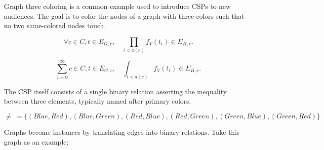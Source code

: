 \begin{comment}

\begin{betterpython}
    def even_constraint(last_state, next_state_var, solver):
        n = solver.IntVar(0, solver.infinity(), 'n_even')
        b = solver.BoolVar('b_even')
        solver.Add(next_state_var - 2 * n <= M * (1 - b))
        solver.Add(next_state_var - 2 * n >= -M * (1 - b))
        return [(b, 1)]
\end{betterpython}

\begin{lstlisting}{python}
    def odd_constraint(last_state, next_state_var, solver):
        n = solver.IntVar(0, solver.infinity(), 'n_odd')
        b = solver.BoolVar('b_odd')
        solver.Add(next_state_var - 2 * n - 1 <= M * (1 - b))
        solver.Add(next_state_var - 2 * n - 1 >= -M * (1 - b))
        return [(b, 1)]
\end{lstlisting}

\end{comment}
Graph three coloring is a common example used to introduce CSPs to new audiences. The goal is to color the nodes of a graph with three colors such that no two same-colored nodes touch. 

\begin{equation}
    \forall c \in C, t \in E_{G, c}, \quad \prod_{i<a(c)} f_V(t_i) \in E_{H, c}.    
\end{equation}


\begin{equation}
    \sum_{i=0}^\infty c \in C, t \in E_{G, c}, \quad \int_{i<a(c)} f_V(t_i) \in E_{H, c}.    
\end{equation}

The CSP itself consists of a single binary relation asserting the inequality between three elements, typically named after primary colors.

\begin{equation}\label{equation:three-color-neq-def}
  \scriptscriptstyle \neq\ = \{ (\mathit{Blue}, \mathit{Red}), (\mathit{Blue}, \mathit{Green}), (\mathit{Red}, \mathit{Blue}), (\mathit{Red}, \mathit{Green}), (\mathit{Green}, \mathit{Blue}), (\mathit{Green}, \mathit{Red}) \}
\end{equation}

Graphs become instances by translating edges into binary relations. Take this graph as an example;

\begin{center}
\end{center}

